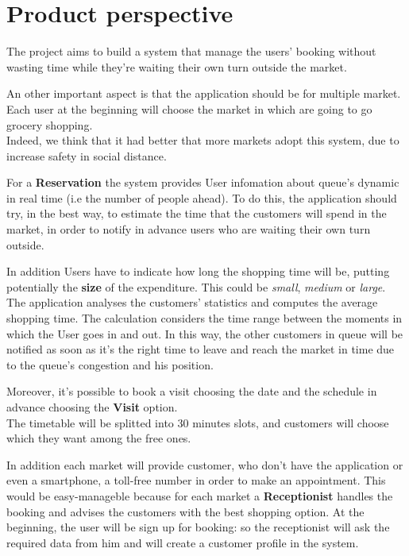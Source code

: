 \section{Product perspective}

The project aims to build a system that manage the users’ booking without wasting time while they're waiting their own turn outside the market. 
\par
An other important aspect is that the application should be for multiple market. Each user at the beginning will choose the market in which are going to go grocery shopping.\\
Indeed, we think that it had better that more markets adopt this system, due to increase safety in social distance.
\par
For a \textbf{Reservation} the system provides User infomation about queue's dynamic in real time (i.e the number of people ahead). 
To do this, the application should try, in the best way, to estimate the time that the customers will spend in the market, in order to notify in advance users who are waiting their own turn outside. 



In addition Users have to indicate how long the shopping time will be, putting potentially the \textbf{size} of the expenditure. This could be \textit{small}, \textit{medium} or \textit{large}.
\\
The application analyses the customers’ statistics and computes the average shopping time.
The calculation considers the time range between the moments in which the User goes in and out.  
In this way, the other customers in queue will be notified as soon as it's the right time to leave and reach the market in time due to the queue's congestion and his position.  

\par
Moreover, it's possible to book a visit choosing the date and the schedule in advance choosing the \textbf{Visit} option. 
\\
The timetable will be splitted into 30 minutes slots, and customers will choose which they want among the free ones. \par

In addition each market will provide customer, who don't have the application or even a smartphone, a toll-free number in order to make an appointment.
This would be easy-manageble because for each market a \textbf{Receptionist} handles the booking and advises the customers with the best shopping option. %
At the beginning, the user will be sign up for booking: so the receptionist will ask the required data from him and will create a customer profile in the system.

